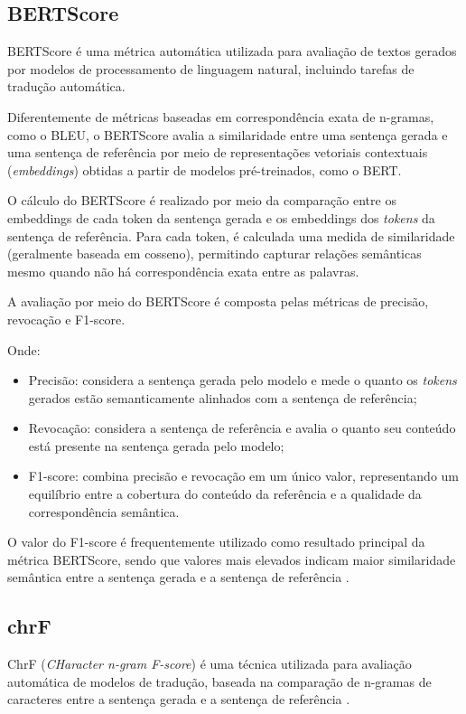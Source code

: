 \subsection{BERTScore}
    BERTScore é uma métrica automática utilizada para avaliação de textos gerados por modelos de processamento de linguagem natural, incluindo tarefas de tradução automática.

    Diferentemente de métricas baseadas em correspondência exata de n-gramas, como o BLEU, o BERTScore avalia a similaridade entre uma sentença gerada e uma sentença de referência por meio de representações vetoriais contextuais (\textit{embeddings}) obtidas a partir de modelos pré-treinados, como o BERT.

    O cálculo do BERTScore é realizado por meio da comparação entre os embeddings de cada token da sentença gerada e os embeddings dos \textit{tokens} da sentença de referência. Para cada token, é calculada uma medida de similaridade (geralmente baseada em cosseno), permitindo capturar relações semânticas mesmo quando não há correspondência exata entre as palavras.

    A avaliação por meio do BERTScore é composta pelas métricas de precisão, revocação e F1-score.

    Onde:

\begin{itemize}
    \item Precisão: considera a sentença gerada pelo modelo e mede o quanto os \textit{tokens} gerados estão semanticamente alinhados com a sentença de referência;
    
    \item Revocação: considera a sentença de referência e avalia o quanto seu conteúdo está presente na sentença gerada pelo modelo;
    
    \item F1-score: combina precisão e revocação em um único valor, representando um equilíbrio entre a cobertura do conteúdo da referência e a qualidade da correspondência semântica.
\end{itemize}

    O valor do F1-score é frequentemente utilizado como resultado principal da métrica BERTScore, sendo que valores mais elevados indicam maior similaridade semântica entre a sentença gerada e a sentença de referência \cite{zhang2019bertscore}.


\subsection{chrF}
    ChrF (\textit{CHaracter n-gram F-score}) é uma técnica utilizada para avaliação automática de modelos de tradução, baseada na comparação de n-gramas de caracteres entre a sentença gerada e a sentença de referência \cite{popovic2015chrf}.

